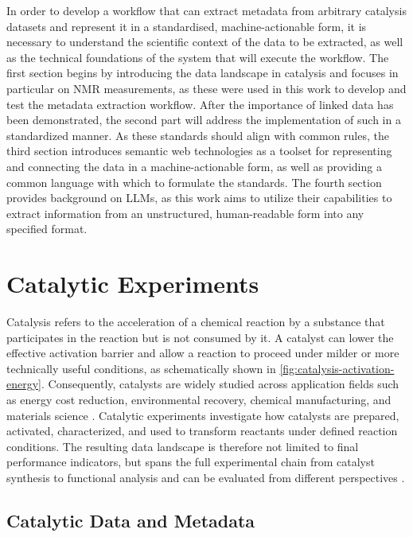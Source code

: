 \label{chap:background}

In order to develop a workflow that can extract metadata from arbitrary catalysis datasets and represent it in a standardised, machine-actionable form, it is necessary to understand the scientific context of the data to be extracted, as well as the technical foundations of the system that will execute the workflow.
The first section begins by introducing the data landscape in catalysis and focuses in particular on NMR measurements, as these were used in this work to develop and test the metadata extraction workflow.
After the importance of linked data has been demonstrated, the second part will address the implementation of such in a standardized manner.
As these standards should align with common rules, the third section introduces semantic web technologies as a toolset for representing and connecting the data in a machine-actionable form, as well as providing a common language with which to formulate the standards.
The fourth section provides background on \acp{LLM}, as this work aims to utilize their capabilities to extract information from an unstructured, human-readable form into any specified format.

\section{Catalytic Experiments}
\label{sec:catalytic-experiments}

Catalysis refers to the acceleration of a chemical reaction by a substance that participates in the reaction but is not consumed by it.
A catalyst can lower the effective activation barrier and allow a reaction to proceed under milder or more technically useful conditions, as schematically shown in \cref{fig:catalysis-activation-energy}.
Consequently, catalysts are widely studied across application fields such as energy cost reduction, environmental recovery, chemical manufacturing, and materials science \cite{osman2024coordination}.
Catalytic experiments investigate how catalysts are prepared, activated, characterized, and used to transform reactants under defined reaction conditions.
The resulting data landscape is therefore not limited to final performance indicators, but spans the full experimental chain from catalyst synthesis to functional analysis and can be evaluated from different perspectives \cite{marshall2023digital}.


\subsection{Catalytic Data and Metadata}
\label{sec:catalytic-data-metadata}

